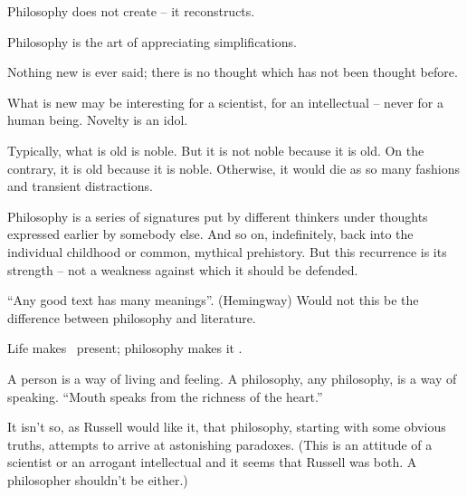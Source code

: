 \pa
Philosophy does not create -- it reconstructs.

\pa
Philosophy is the art of appreciating simplifications.

\pa
Nothing new is ever said; there is no thought which has not been
thought before. 

What is new may be interesting for a scientist, for an intellectual --
never for a human being. Novelty is an idol.  

Typically, what is old is noble. But it is not noble because it is
old. On the contrary, it is old because it is noble.  Otherwise, it
would die as so many fashions and transient distractions. 

Philosophy
is a series of signatures put by different thinkers under thoughts
expressed earlier by somebody else. And so on, indefinitely, back into
the individual childhood or common, mythical prehistory.  But this
recurrence is its strength -- not a weakness against which it should
be defended.


\pa
``Any good text has many meanings''. (Hemingway)
Would not this be the difference between philosophy and literature.

\pa
Life makes \HH\ present; philosophy makes it \LL.

\pa A person is a way of living and feeling. 
A philosophy, any philosophy, is a way of speaking. 
``Mouth speaks from the richness of the heart.''  

\pa
It isn't so, as Russell would like it, that philosophy, starting with 
some obvious truths, attempts to arrive at astonishing paradoxes. 
(This is an attitude of a scientist or an arrogant intellectual and 
it seems that Russell was both. A philosopher shouldn't be either.) 

